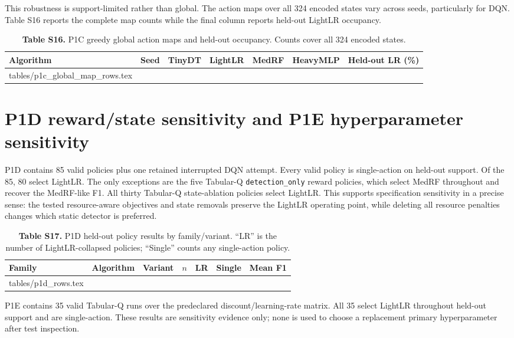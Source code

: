 \documentclass[10pt,a4paper]{article}
\makeatletter
\newcommand{\tableinput}[1]{\@@input #1.tex }
\makeatother
\begin{document}
This robustness is support-limited rather than global. The action maps over all 324 encoded states vary across seeds, particularly for DQN. Table S16 reports the complete map counts while the final column reports held-out LightLR occupancy.

\begin{table}[h!]
\centering\footnotesize
\caption*{\textbf{Table S16.} P1C greedy global action maps and held-out occupancy. Counts cover all 324 encoded states.}
\setlength{\tabcolsep}{3.3pt}
\begin{tabular}{lrrrrrr}\toprule
Algorithm & Seed & TinyDT & LightLR & MedRF & HeavyMLP & Held-out LR (\%)\\\midrule
\tableinput{tables/p1c_global_map_rows}
\bottomrule\end{tabular}
\end{table}

\clearpage
\section{P1D reward/state sensitivity and P1E hyperparameter sensitivity}
P1D contains 85 valid policies plus one retained interrupted DQN attempt. Every valid policy is single-action on held-out support. Of the 85, 80 select LightLR. The only exceptions are the five Tabular-Q \texttt{detection\_only} reward policies, which select MedRF throughout and recover the MedRF-like F1. All thirty Tabular-Q state-ablation policies select LightLR. This supports specification sensitivity in a precise sense: the tested resource-aware objectives and state removals preserve the LightLR operating point, while deleting all resource penalties changes which static detector is preferred.

\begin{table}[h!]
\centering\footnotesize
\caption*{\textbf{Table S17.} P1D held-out policy results by family/variant. ``LR'' is the number of LightLR-collapsed policies; ``Single'' counts any single-action policy.}
\setlength{\tabcolsep}{3.2pt}
\begin{tabular}{lllrrrr}\toprule
Family & Algorithm & Variant & $n$ & LR & Single & Mean F1\\\midrule
\tableinput{tables/p1d_rows}
\bottomrule\end{tabular}
\end{table}

P1E contains 35 valid Tabular-Q runs over the predeclared discount/learning-rate matrix. All 35 select LightLR throughout held-out support and are single-action. These results are sensitivity evidence only; none is used to choose a replacement primary hyperparameter after test inspection.
\end{document}
